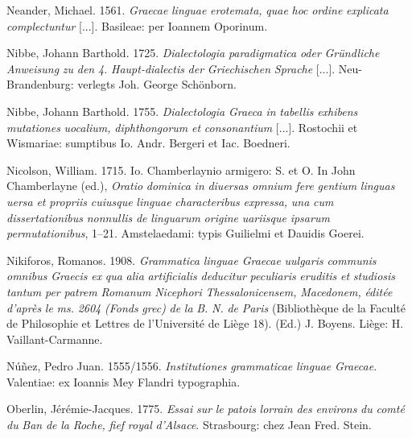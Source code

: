 Neander, Michael. 1561. \textit{Graecae} \textit{linguae} \textit{erotemata,} \textit{quae} \textit{hoc} \textit{ordine} \textit{explicata} \textit{complectuntur} [...]. Basileae: per Ioannem Oporinum.

Nibbe, Johann Barthold. 1725. \textit{Dialectologia} \textit{paradigmatica} \textit{oder} \textit{Gründliche} \textit{Anweisung} \textit{zu} \textit{den} \textit{4.} \textit{Haupt-dialectis} \textit{der} \textit{Griechischen} \textit{Sprache} [...]. Neu-Brandenburg: verlegts Joh. George Schönborn.

Nibbe, Johann Barthold. 1755. \textit{Dialectologia} \textit{Graeca} \textit{in} \textit{tabellis} \textit{exhibens} \textit{mutationes} \textit{uocalium,} \textit{diphthongorum} \textit{et} \textit{consonantium} [...]. Rostochii et Wismariae: sumptibus Io. Andr. Bergeri et Iac. Boedneri.

Nicolson, William. 1715. Io. Chamberlaynio armigero: S. et O. In John Chamberlayne (ed.), \textit{Oratio} \textit{dominica} \textit{in} \textit{diuersas} \textit{omnium} \textit{fere} \textit{gentium} \textit{linguas} \textit{uersa} \textit{et} \textit{propriis} \textit{cuiusque} \textit{linguae} \textit{characteribus} \textit{expressa,} \textit{una} \textit{cum} \textit{dissertationibus} \textit{nonnullis} \textit{de} \textit{linguarum} \textit{origine} \textit{uariisque} \textit{ipsarum} \textit{permutationibus}, 1–21. Amstelaedami: typis Guilielmi et Dauidis Goerei.

Nikiforos, Romanos. 1908. \textit{Grammatica} \textit{linguae} \textit{Graecae} \textit{uulgaris} \textit{communis} \textit{omnibus} \textit{Graecis} \textit{ex} \textit{qua} \textit{alia} \textit{artificialis} \textit{deducitur} \textit{peculiaris} \textit{eruditis} \textit{et} \textit{studiosis} \textit{tantum} \textit{per} \textit{patrem} \textit{Romanum} \textit{Nicephori} \textit{Thessalonicensem,} \textit{Macedonem,} \textit{éditée} \textit{d’après} \textit{le} \textit{ms.} \textit{2604} \textit{(Fonds} \textit{grec)} \textit{de} \textit{la} \textit{B.} \textit{N.} \textit{de} \textit{Paris} (Bibliothèque de la Faculté de Philosophie et Lettres de l’Université de Liège 18). (Ed.) J. Boyens. Liège: H. Vaillant-Carmanne.

Núñez, Pedro Juan. 1555/1556. \textit{Institutiones} \textit{grammaticae} \textit{linguae} \textit{Graecae}. Valentiae: ex Ioannis Mey Flandri typographia.

Oberlin, Jérémie-Jacques. 1775. \textit{Essai} \textit{sur} \textit{le} \textit{patois} \textit{lorrain} \textit{des} \textit{environs} \textit{du} \textit{comté} \textit{du} \textit{Ban} \textit{de} \textit{la} \textit{Roche,} \textit{fief} \textit{royal} \textit{d’Alsace}. Strasbourg: chez Jean Fred. Stein.

